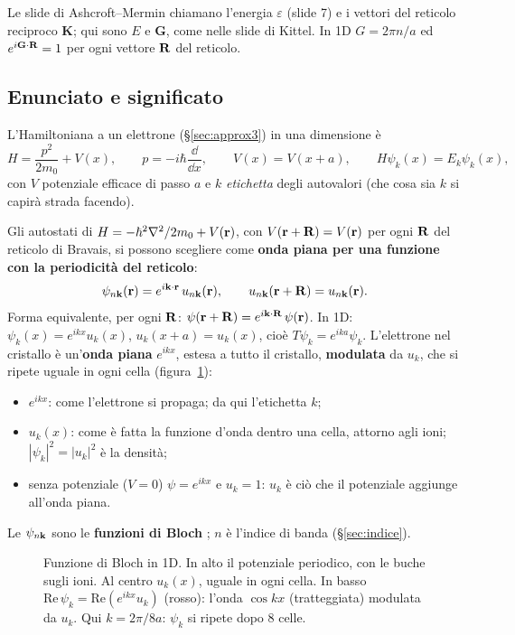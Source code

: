 \documentclass[11pt,a4paper]{article}
\begin{document}
\begin{osservazione}[notazione]
Le slide di Ashcroft--Mermin chiamano l'energia $\varepsilon$ (slide 7) e i vettori del reticolo reciproco $\mathbf K$; qui sono $E$ e $\mathbf G$, come
nelle slide di Kittel. In 1D $G=2\pi n/a$ ed $e^{i\mathbf G\cdot\mathbf R}=1$ per ogni vettore $\mathbf R$ del reticolo.
\end{osservazione}

\subsection{Enunciato e significato}
L'Hamiltoniana a un elettrone (§\ref{sec:approx3}) in una dimensione è
\[
H=\frac{p^2}{2m_0}+V(x),\qquad p=-i\hbar\frac{\dd}{\dd x},\qquad V(x)=V(x+a),\qquad H\psi_k(x)=E_k\psi_k(x),
\]
con $V$ potenziale efficace di passo $a$ e $k$ \emph{etichetta} degli autovalori (che cosa sia $k$ si capirà strada facendo).

\begin{teorema}[di Bloch]\label{teo:bloch}
Gli autostati di $H=-\hbar^2\nabla^2/2m_0+V(\mathbf r)$, con $V(\mathbf r+\mathbf R)=V(\mathbf r)$ per ogni $\mathbf R$ del reticolo di Bravais, si possono scegliere come
\textbf{onda piana per una funzione con la periodicità del reticolo}:
\[
\psi_{n\mathbf k}(\mathbf r)=e^{i\mathbf k\cdot\mathbf r}\,u_{n\mathbf k}(\mathbf r),\qquad u_{n\mathbf k}(\mathbf r+\mathbf R)=u_{n\mathbf k}(\mathbf r).
\]
Forma equivalente, per ogni $\mathbf R$: $\psi(\mathbf r+\mathbf R)=e^{i\mathbf k\cdot\mathbf R}\,\psi(\mathbf r)$. In 1D: $\psi_k(x)=e^{ikx}u_k(x)$, $u_k(x+a)=u_k(x)$, cioè
$T\psi_k=e^{ika}\psi_k$.
\tcblower
L'elettrone nel cristallo è un'\textbf{onda piana} $e^{ikx}$, estesa a tutto il cristallo, \textbf{modulata} da $u_k$, che si ripete uguale in ogni cella
(figura~\ref{fig:bloch}):
\begin{itemize}[leftmargin=*]
\item $e^{ikx}$: come l'elettrone si propaga; da qui l'etichetta $k$;
\item $u_k(x)$: come è fatta la funzione d'onda dentro una cella, attorno agli ioni; $|\psi_k|^2=|u_k|^2$ è la densità;
\item senza potenziale ($V=0$) $\psi=e^{ikx}$ e $u_k=1$: $u_k$ è ciò che il potenziale aggiunge all'onda piana.
\end{itemize}
\end{teorema}
Le $\psi_{n\mathbf k}$ sono le \textbf{funzioni di Bloch} ; $n$ è l'indice di banda (§\ref{sec:indice}).

\begin{figure}[tbp]
\centering
{}
\caption{Funzione di Bloch in 1D. In alto il potenziale periodico, con le buche sugli ioni. Al centro $u_k(x)$, uguale in ogni cella. In basso
$\mathrm{Re}\,\psi_k=\mathrm{Re}(e^{ikx}u_k)$ (rosso): l'onda $\cos kx$ (tratteggiata) modulata da $u_k$. Qui $k=2\pi/8a$: $\psi_k$ si ripete dopo 8 celle.}\label{fig:bloch}
\end{figure}
\end{document}
